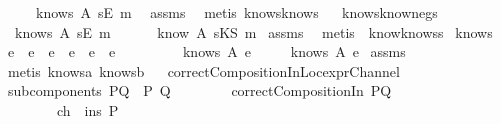 \begin{isabellebody}
\ \ \ \ {\isachardoublequoteopen}{\isasymnot}\ knows\ A\ {\isacharbrackleft}sE\ m{\isacharbrackright}{\isachardoublequoteclose}\ \isanewline
%
\isadelimproof
%
\endisadelimproof
%
\isatagproof
{}\isamarkupfalse%
\ assms\ \isamarkupfalse%
\ {\isacharparenleft}metis\ knows{}know{\isacharunderscore}s{\isacharparenright}%
\endisatagproof
{\isafoldproof}%
%
\isadelimproof
\ \isanewline
%
\endisadelimproof
\isanewline
{}\isamarkupfalse%
\ knows{}know{\isacharunderscore}neg{\isacharunderscore}s{\isacharcolon}\ \isanewline
{}\ {\isachardoublequoteopen}{\isasymnot}\ knows\ A\ {\isacharbrackleft}sE\ m{\isacharbrackright}{\isachardoublequoteclose}\ \isanewline
{}\ \ \ \ {\isachardoublequoteopen}{\isasymnot}\ know\ A\ {\isacharparenleft}sKS\ m{\isacharparenright}{\isachardoublequoteclose}\isanewline
%
\isadelimproof
%
\endisadelimproof
%
\isatagproof
{}\isamarkupfalse%
\ assms\ \isamarkupfalse%
\ {\isacharparenleft}metis\ \ know{}knows{\isacharunderscore}s{\isacharparenright}%
\endisatagproof
{\isafoldproof}%
%
\isadelimproof
\isanewline
%
\endisadelimproof
\isanewline
{}\isamarkupfalse%
\ knows{}{\isacharcolon}\ \isanewline
{}\ {\isachardoublequoteopen}e{}\ {\isacharequal}\ e{}\ {\isacharat}\ e\ {\isasymor}\ e{}\ {\isacharequal}\ e\ {\isacharat}\ e{}{\isachardoublequoteclose}\ \isanewline
\ \ \ \ \ \ \ \ {\isachardoublequoteopen}knows\ A\ e{}{\isachardoublequoteclose}\ \isanewline
{}\ \ \ \ {\isachardoublequoteopen}knows\ A\ e{\isachardoublequoteclose}\isanewline
%
\isadelimproof
%
\endisadelimproof
%
\isatagproof
{}\isamarkupfalse%
\ assms\ \isamarkupfalse%
\ {\isacharparenleft}metis\ knows{}a\ knows{}b{\isacharparenright}%
\endisatagproof
{\isafoldproof}%
%
\isadelimproof
\isanewline
%
\endisadelimproof
\ \isanewline
{}\isamarkupfalse%
\ correctCompositionInLoc{\isacharunderscore}exprChannel{\isacharcolon}\isanewline
{}\ {\isachardoublequoteopen}subcomponents\ PQ\ {\isacharequal}\ {\isacharbraceleft}P{\isacharcomma}\ Q{\isacharbraceright}{\isachardoublequoteclose}\isanewline
\ \ \ \ \ \ \ \ {\isachardoublequoteopen}correctCompositionIn\ PQ{\isachardoublequoteclose}\isanewline
\ \ \ \ \ \ \ \ {\isachardoublequoteopen}ch\ {\isacharcolon}\ ins\ P{\isachardoublequoteclose}\isanewline

\end{isabellebody}
